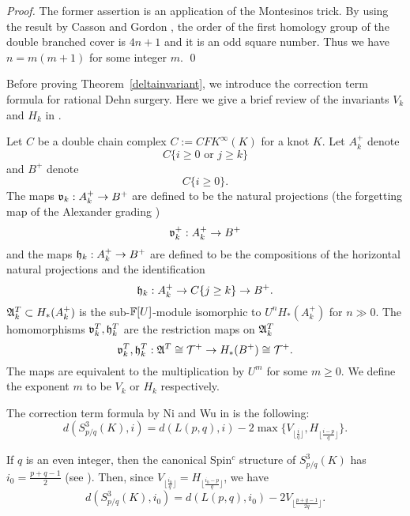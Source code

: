 \documentclass[11pt]{amsart}
\begin{document}
\begin{proof}
The former assertion is an application of the Montesinos trick.
By using the result by Casson and Gordon \cite{CG}, the order of the first homology group of the
double branched cover is $4n+1$ and it is an odd square number.
Thus we have $n=m(m+1)$ for some integer $m$.
\qed
\end{proof}

Before proving Theorem~\ref{deltainvariant},
we introduce the correction term formula for rational Dehn surgery.
Here we give a brief review of the invariants $V_k$ and $H_k$ in \cite{ZW}.

Let $C$ be a double chain complex $C:=CFK^\infty(K)$ for a knot $K$.
Let $A_k^+$ denote
$$C\{i\ge 0\text{ or }j\ge k\}$$
and $B^+$ denote
$$C\{i\ge 0\}.$$
The maps $\frak{v}_k:A_k^+\to B^+$ are defined to be the natural projections (the forgetting map of the Alexander grading	)
$$\frak{v}_k^+:A_k^+\to B^+$$
and the maps $\frak{h}_k:A_k^+\to B^+$ are defined to be the compositions of the horizontal natural projections and the identification
$$\frak{h}_k:A_k^+\to C\{j\ge k\}\to B^+.$$
$\frak{A}_k^T\subset H_\ast(A_k^+)$ is the sub-${\Bbb F}[U]$-module isomorphic to $U^nH_\ast(A_k^+)$ for $n\gg 0$.
The homomorphisms $\frak{v}_k^T,\frak{h}_k^T$ are the restriction maps on $\frak{A}_k^T$
$$\frak{v}_k^T,\frak{h}_k^T:\frak{A}^T\cong{\mathcal T}^+\to H_{\ast}(B^+)\cong {\mathcal T}^+.$$
The maps are equivalent to the multiplication by $U^m$ for some $m\ge 0$.
We define the exponent $m$ to be $V_k$ or $H_k$ respectively.

The correction term formula by Ni and Wu in \cite{ZW} is the following:
$$d(S^3_{p/q}(K),i)=d(L(p,q),i)-2\max\{V_{\lfloor\frac{i}{q}\rfloor},H_{\lfloor\frac{i-p}{q}\rfloor}\}.$$

If $q$ is an even integer, then the canonical Spin$^c$ structure of $S^3_{p/q}(K)$ has $i_0=\frac{p+q-1}{2}$ (see \cite{MT}).
Then, since $V_{\lfloor\frac{i_0}{q}\rfloor}=H_{\lfloor\frac{i_0-p}{q}\rfloor}$, we have
$$d(S^3_{p/q}(K),i_0)=d(L(p,q),i_0)-2V_{\lfloor\frac{p+q-1}{2q}\rfloor}.$$
\end{document}
